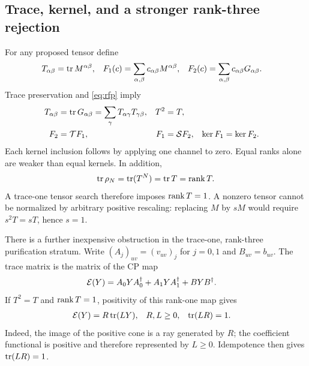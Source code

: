 \documentclass[aps,pra,reprint,nofootinbib,onecolumn]{revtex4-2}
\begin{document}
\subsection{Trace, kernel, and a stronger rank-three rejection}

For any proposed tensor define
\begin{align}
	T_{\alpha\beta} & =\operatorname{tr} M^{\alpha\beta},                               &
	F_1(c)          & =\sum_{\alpha,\beta}c_{\alpha\beta}M^{\alpha\beta}, &
	F_2(c)          & =\sum_{\alpha,\beta}c_{\alpha\beta}G_{\alpha\beta}.
\end{align}
Trace preservation and \cref{eq:rfp} imply
\begin{align}
	T_{\alpha\beta}
	    & =\operatorname{tr} G_{\alpha\beta}
	=\sum_\gamma T_{\alpha\gamma}T_{\gamma\beta},
	    & T^2                  & =T,
	\nonumber                                             \\
	F_2 & =\mathcal{T} F_1,          & F_1        & =\mathcal{S} F_2,
	    & \ker F_1             & =\ker F_2.
	\label{eq:cheap}
\end{align}
Each kernel inclusion follows by applying one channel to zero.
Equal ranks alone are weaker than equal kernels. In addition,
\begin{align}
	\operatorname{tr}\rho_N=\operatorname{tr}(T^N)=\operatorname{tr} T=\operatorname{rank} T.
	\label{eq:trace-scale}
\end{align}
A trace-one tensor search therefore imposes $\operatorname{rank} T=1$.
A nonzero tensor cannot be normalized by arbitrary positive rescaling:
replacing $M$ by $sM$ would require $s^2T=sT$, hence $s=1$.

There is a further inexpensive obstruction in the trace-one,
rank-three purification stratum. Write
$(A_j)_{uv}=(v_{uv})_j$ for $j=0,1$ and $B_{uv}=b_{uv}$.
The trace matrix is the matrix of the CP map
\begin{align}
	\mathcal{E}(Y) & =A_0YA_0^\dagger+A_1YA_1^\dagger+BYB^\dagger.
	\label{eq:trace-cp}
\end{align}
If $T^2=T$ and $\operatorname{rank} T=1$, positivity of this rank-one map gives
\begin{align}
	\mathcal{E}(Y) & =R\operatorname{tr}(LY), &
	R,L      & \geq0,     & \operatorname{tr}(LR) & =1.
\end{align}
Indeed, the image of the positive cone is a ray generated by $R$; the coefficient
functional is positive and therefore represented by $L\geq0$.
Idempotence then gives $\operatorname{tr}(LR)=1$.
\end{document}
